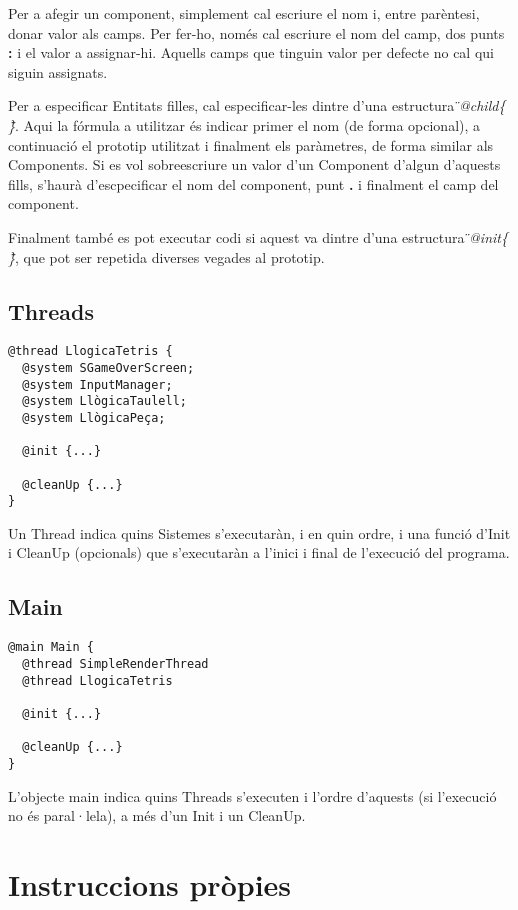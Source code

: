 Per a afegir un component, simplement cal escriure el nom i, entre parèntesi, donar valor als camps. Per fer-ho, només cal escriure el nom del camp, dos punts {\bf :} i el valor a assignar-hi. Aquells camps que tinguin valor per defecte no cal qui siguin assignats.

Per a especificar Entitats filles, cal especificar-les dintre d'una estructura {\em\"{}@child\{ \}\"{}}. Aqui la fórmula a utilitzar és indicar primer el nom (de forma opcional), a continuació el prototip utilitzat i finalment els paràmetres, de forma similar als Components. Si es vol sobreescriure un valor d'un Component d'algun d'aquests fills, s'haurà d'escpecificar el nom del component, punt {\bf .} i finalment el camp del component.

Finalment també es pot executar codi si aquest va dintre d'una estructura {\em\"{}@init\{ \}\"{}}, que pot ser repetida diverses vegades al prototip.

\subsection{Threads}

\begin{verbatim}
@thread LlogicaTetris {
  @system SGameOverScreen;
  @system InputManager;
  @system LlògicaTaulell;
  @system LlògicaPeça;
  
  @init {...}
  
  @cleanUp {...}
}
\end{verbatim}

Un Thread indica quins Sistemes s'executaràn, i en quin ordre, i una funció d'Init i CleanUp (opcionals) que s'executaràn a l'inici i final de l'execució del programa.

\subsection{Main}

\begin{verbatim}
@main Main {
  @thread SimpleRenderThread
  @thread LlogicaTetris
  
  @init {...}
  
  @cleanUp {...}
}
\end{verbatim}

L'objecte main indica quins Threads s'executen i l'ordre d'aquests (si l'execució no és paral·lela), a més d'un Init i un CleanUp.

\section{Instruccions pròpies}

